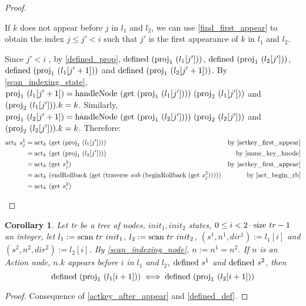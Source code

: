 \documentclass{article}
\newtheorem{corollary}[lemma]{Corollary}
\newcommand{\textfun}[1]{\textup{#1}}
\newcommand{\traverse}[2]{\textfun{traverse}\ #1\ #2}
\newcommand{\scan}[2]{\textfun{scan}\ #1\ #2}
\newcommand{\hNode}[2]{\textfun{handleNode}\ #1\ #2}
\newcommand{\beginRb}[1]{\textfun{beginRollback}\ #1}
\newcommand{\enRb}[1]{\textfun{endRollback}\ #1}
\newcommand{\defined}[1]{\textfun{defined}\ #1}
\newcommand{\get}[1]{\textfun{get}\ #1}
\newcommand{\size}[1]{\textfun{size}\ #1}
\newcommand{\fst}[1]{\textfun{proj}_1\ #1}
\newcommand{\snd}[1]{\textfun{proj}_2\ #1}
\newcommand{\actkey}[2]{\textfun{act}_{#1}\ #2}
\begin{document}
\begin{proof}
\begin{itemize}
        If $k$ does not appear before $j$ in $l_1$ and $l_2$, we can use \cref{find_first_appear} to obtain the index $j \leq j' < i$ such that $j'$ is the
        first appearance of $k$ in $l_1$ and $l_2$. 

        Since $j' < i$ , by \cref{defined_prop}, $\defined{(\fst{(l_1[j'])})}$, $\defined{(\fst{(l_2[j'])})}$, $\defined{(\fst{(l_1[j' + 1])})}$ and  $\defined{(\fst{(l_2[j' + 1])})}$.
        By \cref{scan_indexing_state}, $\fst{(l_1[j' + 1])} = \hNode{(\get{(\fst{(l_1[j'])})})}{(\snd{(l_1[j'])})}$ and $(\snd{(l_1[j'])}).k = k$.
        Similarly, $\fst{(l_2[j' + 1])} = \hNode{(\get{(\fst{(l_2[j'])})})}{(\snd{(l_2[j'])})}$ and $(\snd{(l_2[j'])}).k = k$.
        Therefore:
        \begin{align*}
            \actkey{k}{s^1_{j}} &= \actkey{k}{(\get{(\fst{(l_1[j'])})})} &\text{by \cref{actkey_first_appear}} \\
            &= \actkey{k}{(\get{(\fst{(l_2[j'])})})} &\text{by \cref{same_key_hnode}} \\
            &= \actkey{k}{(\get{s^2_{j}})} &\text{by \cref{actkey_first_appear}} \\
            &= \actkey{k}{(\enRb{(\get{(\traverse{sub}{(\beginRb{(\get{s^2_j})})})})})} &\text{by \cref{act_begin_rb}} \\
            &= \actkey{k}{(\get{s^2_i})}
        \end{align*}
        
    \end{itemize} 

\end{proof}

\begin{corollary}
    \label{same_defined_appear}
    Let tr be a tree of nodes, $init_1, init_2$ states, $0 \leq i < 2\cdot \size{tr} - 1$ an integer, let $l_1 := \scan{tr}{init_1}$, $l_2 := \scan{tr}{init_2}$, $(s^1, n^1, dir^1) := l_1[i]$ and $(s^2, n^2, dir^2) := l_2[i]$. 
    By \cref{scan_indexing_node}, $n := n^1 = n^2$. If $n$ is an Action node, $n.k$ appears before $i$ in $l_1$ and $l_2$, $\defined{s^1}$ and $\defined{s^2}$, then 
    \[\defined{(\fst{(l_1[i + 1])})} \iff \defined{(\fst{(l_2[i + 1])})}\]
\end{corollary}

\begin{proof}
    Consequence of \cref{actkey_after_appear} and \cref{defined_def}.
\end{proof}

\newpage
\end{document}
